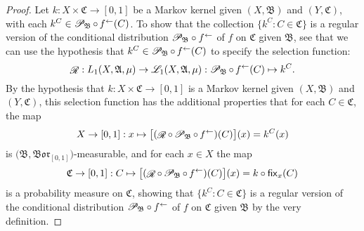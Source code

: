 \documentclass[
twoside=true,
paper=letter,
fontsize=9pt,
pagesize=auto,
leqno,
openany,
headsepline,
overfullrule,
]{scrbook}
\theoremstyle{plain}
\theoremstyle{plain}
\theoremstyle{definition}
\theoremstyle{bfnoteitalic}
\theoremstyle{bfnoteroman}
\newcommand{\sigalg}[1]{\mathfrak{#1}}
\newcommand{\cali}[1]{\mathscr{#1}}
\newcommand{\sfop}[1]{\mathsf{#1}}
\newcommand{\condprobop}[1]{\mathop{\cali{P}\hspace{-1pt}}\nolimits_{#1}}
\newcommand{\borel}{\mathfrak{Bor}}
\newcommand{\preimage}[1]{\mathop{#1^{\leftarrow}}}
\newcommand{\sigmaalgebra}{\sigalg{A}}
\newcommand{\sigmaalgebraii}{\sigalg{B}}
\newcommand{\sigmaalgebraiii}{\sigalg{C}}
\newcommand{\Lone}{L_1(\measurespace, \sigmaalgebra, \measure)}
\newcommand{\caliLone}{\cali{L}_1(\measurespace, \sigmaalgebra, \measure)}
\newcommand{\function}{f}
\newcommand{\measurespace}{X}
\newcommand{\measurespaceii}{Y}
\newcommand{\mspaceelt}{x}
\newcommand{\measure}{\mu}
\newcommand{\setiii}{C}
\newcommand{\regular}{\mathop{\cali{R}}}
\newcommand{\markovkernel}{k}
\newcommand{\fixinthefirst}[1]{\sfop{fix}_{#1}}
\begin{document}
\begin{proof}
Let 
$\markovkernel:\measurespace\times\sigmaalgebraiii\to [0,1]$ 
be a Markov kernel given $(\measurespace, \sigmaalgebraii)$ and $(\measurespaceii, \sigmaalgebraiii)$, with each
$\markovkernel^{\setiii} \in \condprobop{\sigmaalgebraii}\circ \preimage{\function}(\setiii)$.
To show that the collection 
$\{ \markovkernel^{\setiii} :
\setiii\in\sigmaalgebraiii\}$ 
is a regular version of the conditional distribution 
${\condprobop{\sigmaalgebraii}}\circ \preimage{\function}$ of 
$\function$ on $\sigmaalgebraiii$ given $\sigmaalgebraii$, see that we can 
use the hypothesis that 
$\markovkernel^{\setiii} \in \condprobop{\sigmaalgebraii}\circ \preimage{\function}(\setiii)$
to specify the selection function:
\[
\regular:\Lone\to\caliLone:
\condprobop{\sigmaalgebraii}\circ \preimage{\function}(\setiii) \mapsto
\markovkernel^{\setiii}.
\]
By the hypothesis that
$\markovkernel:\measurespace\times\sigmaalgebraiii\to [0,1]$ 
is a Markov kernel given $(\measurespace, \sigmaalgebraii)$ and $(\measurespaceii, \sigmaalgebraiii)$,
this selection function has the  additional properties that for each
$\setiii\in\sigmaalgebraiii$, the map 
\[
\measurespace\to [0,1] : \mspaceelt\mapsto
\bigl[ (\regular\circ\condprobop{\sigmaalgebraii}\circ\preimage{\function}) (\setiii)\bigr](\mspaceelt) 
=
\markovkernel^{\setiii} (\mspaceelt)
\]
is $\bigl(\sigmaalgebraii, \borel_{[0,1]}\bigr)$\hyp{}measurable, and for each 
$\mspaceelt\in\measurespace$ the  map
\[
\sigmaalgebraiii\to [0,1]: \setiii \mapsto 
\bigl[ (\regular\circ\condprobop{\sigmaalgebraii}\circ\preimage{\function}) (\setiii)\bigr](\mspaceelt)
= \markovkernel\circ\fixinthefirst{\mspaceelt}(\setiii)
\]
is a probability measure on $\sigmaalgebraiii$, 
showing that 
$\{ \markovkernel^{\setiii} :
\setiii\in\sigmaalgebraiii\}$ 
is a regular version of the conditional distribution 
${\condprobop{\sigmaalgebraii}}\circ \preimage{\function}$ of 
$\function$ on $\sigmaalgebraiii$ given $\sigmaalgebraii$ by the very definition.


\end{proof}
\end{document}
